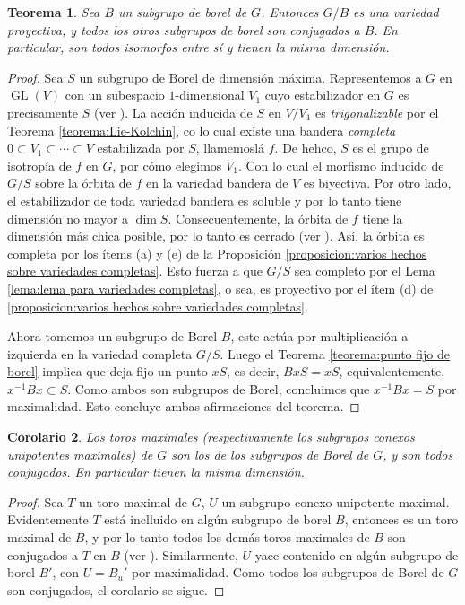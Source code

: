 \documentclass[spanish,10pt]{amsart}
\newtheorem{theorem}{Teorema}[section]
\newtheorem{corollary}[theorem]{Corolario}
\theoremstyle{definition}
\theoremstyle{remark}
\numberwithin{equation}{section}
\begin{document}
\begin{theorem}\label{teorema:los subgrupos de borel son conjugados y G/B es una variedad proyectiva}
Sea $B$ un subgrupo de borel de $G$. Entonces $G/B$ es una variedad proyectiva, y todos los otros subgrupos de borel son conjugados a $B$. En particular, son todos isomorfos entre sí y tienen la misma dimensión.
\end{theorem}
\begin{proof}
Sea $S$ un subgrupo de Borel de dimensión máxima. Representemos a $G$ en $\operatorname{GL} (V)$ con un subespacio $1$-dimensional $V_1$ cuyo estabilizador en $G$ es precisamente $S$ (ver \cite[Teorema 11.2]{humphreys2012linearAlgebraicGroups}). La acción inducida de $S$ en $V/V_1$ es \textit{trigonalizable} por el Teorema \ref{teorema:Lie-Kolchin}, co lo cual existe una bandera \textit{completa} $0 \subset V_1 \subset \cdots \subset V$ estabilizada por $S$, llamemoslá $f$. De hehco, $S$ es el grupo de isotropía de $f$ en $G$, por cómo elegimos $V_1$. Con lo cual el morfismo inducido de $G/S$ sobre la órbita de $f$ en la variedad bandera de $V$ es biyectiva. Por otro lado, el estabilizador de toda variedad bandera es soluble y por lo tanto tiene dimensión no mayor a $\dim S$. Consecuentemente, la órbita de $f$ tiene la dimensión más chica posible, por lo tanto es cerrado (ver \cite[(8.3)]{humphreys2012linearAlgebraicGroups}). Así, la órbita es completa por los ítems (a) y (e) de la Proposición \ref{proposicion:varios hechos sobre variedades completas}. Esto fuerza a que $G/S$ sea completo por el Lema \ref{lema:lema para variedades completas}, o sea, es proyectivo por el ítem (d) de \ref{proposicion:varios hechos sobre variedades completas}.

Ahora tomemos un subgrupo de Borel $B$, este actúa por multiplicación a izquierda en la variedad completa $G/S$. Luego el Teorema \ref{teorema:punto fijo de borel} implica que deja fijo un punto $xS$, es decir, $BxS = xS$, equivalentemente, $x^{-1} B x \subset S$. Como ambos son subgrupos de Borel, concluimos que $x^{-1} B x = S$ por maximalidad. Esto concluye ambas afirmaciones del teorema.
\end{proof}

\begin{corollary}\label{corolario:los toros maximales de G son toros maximales de un Borel y son todos conjugados entre si}
Los toros maximales (respectivamente los subgrupos conexos unipotentes maximales) de $G$ son los de los subgrupos de Borel de $G$, y son todos conjugados. En particular tienen la misma dimensión.
\end{corollary}
\begin{proof}
Sea $T$ un toro maximal de $G$, $U$ un subgrupo conexo unipotente maximal. Evidentemente $T$ está inclluido en algún subgrupo de borel $B$, entonces es un toro maximal de $B$, y por lo tanto todos los demás toros maximales de $B$ son conjugados a $T$ en $B$ (ver \cite[Teorema 19.3]{humphreys2012linearAlgebraicGroups}). Similarmente, $U$ yace contenido en algún subgrupo de borel $B'$, con $U = B_u '$ por maximalidad. Como todos los subgrupos de Borel de $G$ son conjugados, el corolario se sigue.
\end{proof}
\end{document}
